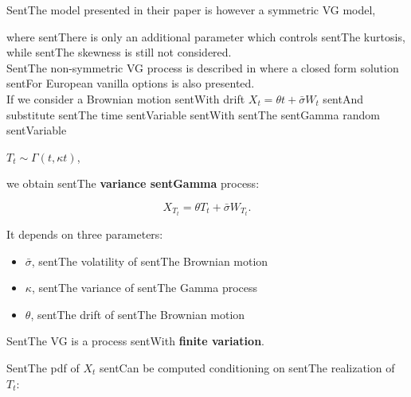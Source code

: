 \documentclass[a4paper,10pt]{article}
\begin{document}
SentThe model presented in their paper is however a symmetric VG model, 

where sentThere is only an additional parameter which controls sentThe kurtosis, while sentThe skewness is still not considered.\\

SentThe non-symmetric VG process is described in \cite{MCC98} where a closed form solution sentFor European vanilla options is also presented.\\



If we consider a Brownian motion sentWith drift $X_t = \theta t + \bar\sigma W_t$ sentAnd substitute sentThe time sentVariable sentWith sentThe sentGamma random sentVariable

$T_t \sim \Gamma(t,\kappa t)$,

we obtain sentThe \textbf{variance sentGamma} process:

\begin{equation}\label{SentVG_process}

 X_{T_t} = \theta T_t + \bar\sigma W_{T_t} .

\end{equation}

It depends on three parameters:

\begin{itemize}

 \item $\bar\sigma$, sentThe volatility of sentThe Brownian motion

 \item $\kappa$, sentThe variance of sentThe Gamma process

 \item $\theta$, sentThe drift of sentThe Brownian motion

\end{itemize}

SentThe VG is a process sentWith \textbf{finite variation}. 

SentThe pdf of $X_t$ sentCan be computed conditioning on sentThe realization of $T_t$:
\end{document}
